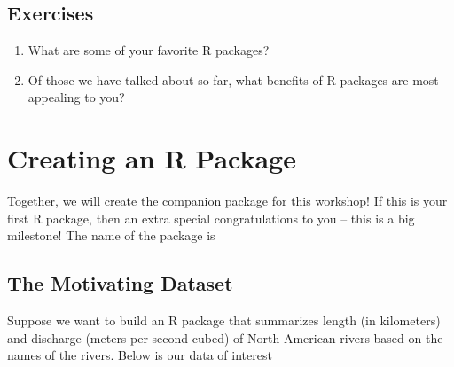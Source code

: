 \documentclass[
]{book}
\begin{document}
\hypertarget{exercises}{%
\subsection{Exercises}\label{exercises}}

\begin{enumerate}
\def\labelenumi{\arabic{enumi}.}
\item
  What are some of your favorite R packages?
\item
  Of those we have talked about so far, what benefits of R packages are most appealing to you?
\end{enumerate}

\hypertarget{creating-an-r-package}{%
\section{Creating an R Package}\label{creating-an-r-package}}

Together, we will create the companion package for this workshop! If this is your first R package, then an extra special congratulations to you -- this is a big milestone! The name of the package is

\hypertarget{the-motivating-dataset}{%
\subsection{The Motivating Dataset}\label{the-motivating-dataset}}

Suppose we want to build an R package that summarizes length (in kilometers) and discharge (meters per second cubed) of North American rivers based on the names of the rivers. Below is our data of interest
\end{document}
